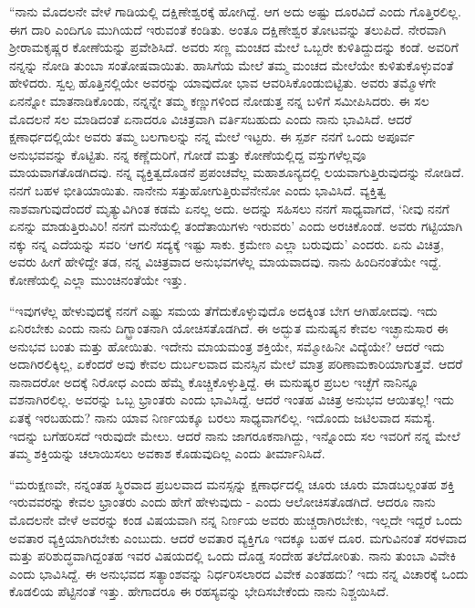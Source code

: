 “ನಾನು ಮೊದಲನೇ ವೇಳೆ ಗಾಡಿಯಲ್ಲಿ ದಕ್ಷಿಣೇಶ್ವರಕ್ಕೆ ಹೋಗಿದ್ದೆ. ಆಗ ಅದು ಅಷ್ಟು ದೂರವಿದೆ ಎಂದು ಗೊತ್ತಿರಲಿಲ್ಲ. ಈಗ ದಾರಿ ಎಂದಿಗೂ ಮುಗಿಯದೆ ಇರುವಂತೆ ಕಂಡಿತು. ಅಂತೂ ದಕ್ಷಿಣೇಶ್ವರ ತೋಟವನ್ನು ತಲುಪಿದೆ. ನೇರವಾಗಿ ಶ‍್ರೀರಾಮಕೃಷ್ಣರ ಕೋಣೆಯನ್ನು ಪ್ರವೇಶಿಸಿದೆ. ಅವರು ಸಣ್ಣ ಮಂಚದ ಮೇಲೆ ಒಬ್ಬರೇ ಕುಳಿತಿದ್ದುದನ್ನು ಕಂಡೆ. ಅವರಿಗೆ ನನ್ನನ್ನು ನೋಡಿ ತುಂಬಾ ಸಂತೋಷವಾಯಿತು. ಹಾಸಿಗೆಯ ಮೇಲೆ ತಮ್ಮ ಮಂಚದ ಮೇಲೆಯೇ ಕುಳಿತುಕೊಳ್ಳುವಂತೆ ಹೇಳಿದರು. ಸ್ವಲ್ಪ ಹೊತ್ತಿನಲ್ಲಿಯೇ ಅವರನ್ನು ಯಾವುದೋ ಭಾವ ಆವರಿಸಿಕೊಂಡುಬಿಟ್ಟಿತು. ಅವರು ತಮ್ಮೊಳಗೇ ಏನನ್ನೋ ಮಾತನಾಡಿಕೊಂಡು, ನನ್ನನ್ನೇ ತಮ್ಮ ಕಣ್ಣುಗಳಿಂದ ನೋಡುತ್ತ ನನ್ನ ಬಳಿಗೆ ಸಮೀಪಿಸಿದರು. ಈ ಸಲ ಮೊದಲನೆ ಸಲ ಮಾಡಿದಂತೆ ಏನಾದರೂ ವಿಚಿತ್ರವಾಗಿ ವರ್ತಿಸಬಹುದು ಎಂದು ನಾನು ಭಾವಿಸಿದೆ. ಆದರೆ ಕ್ಷಣಾರ್ಧದಲ್ಲಿಯೇ ಅವರು ತಮ್ಮ ಬಲಗಾಲನ್ನು ನನ್ನ ಮೇಲೆ ಇಟ್ಟರು. ಈ ಸ್ಪರ್ಶ ನನಗೆ ಒಂದು ಅಪೂರ್ವ ಅನುಭವವನ್ನು ಕೊಟ್ಟಿತು. ನನ್ನ ಕಣ್ಣೆದುರಿಗೆ, ಗೋಡೆ ಮತ್ತು ಕೋಣೆಯಲ್ಲಿದ್ದ ವಸ್ತುಗಳೆಲ್ಲವೂ ಮಾಯವಾಗತೊಡಗಿದವು. ನನ್ನ ವ್ಯಕ್ತಿತ್ವದೊಡನೆ ಪ್ರಪಂಚವೆಲ್ಲ ಮಹಾಶೂನ್ಯದಲ್ಲಿ ಲಯವಾಗುತ್ತಿರುವುದನ್ನು ನೋಡಿದೆ. ನನಗೆ ಬಹಳ ಭೀತಿಯಾಯಿತು. ನಾನೇನು ಸತ್ತುಹೋಗುತ್ತಿರುವೆನೇನೋ ಎಂದು ಭಾವಿಸಿದೆ. ವ್ಯಕ್ತಿತ್ವ ನಾಶವಾಗುವುದೆಂದರೆ ಮೃತ್ಯುವಿಗಿಂತ ಕಡಮೆ ಏನಲ್ಲ ಅದು. ಅದನ್ನು ಸಹಿಸಲು ನನಗೆ ಸಾಧ್ಯವಾಗದೆ, ‘ನೀವು ನನಗೆ ಏನನ್ನು ಮಾಡುತ್ತಿರುವಿರಿ! ನನಗೆ ಮನೆಯಲ್ಲಿ ತಂದೆತಾಯಿಗಳು ಇರುವರು’ ಎಂದು ಅರಚಿಕೊಂಡೆ. ಅವರು ಗಟ್ಟಿಯಾಗಿ ನಕ್ಕು ನನ್ನ ಎದೆಯನ್ನು ಸವರಿ ‘ಆಗಲಿ ಸದ್ಯಕ್ಕೆ ಇಷ್ಟು ಸಾಕು. ಕ್ರಮೇಣ ಎಲ್ಲಾ ಬರುವುದು’ ಎಂದರು. ಏನು ವಿಚಿತ್ರ, ಅವರು ಹೀಗೆ ಹೇಳಿದ್ದೇ ತಡ, ನನ್ನ ವಿಚಿತ್ರವಾದ ಅನುಭವಗಳೆಲ್ಲ ಮಾಯವಾದವು. ನಾನು ಹಿಂದಿನಂತೆಯೇ ಇದ್ದೆ. ಕೋಣೆಯಲ್ಲಿ ಎಲ್ಲಾ ಮುಂಚಿನಂತೆಯೇ ಇತ್ತು.

“ಇವುಗಳೆಲ್ಲ ಹೇಳುವುದಕ್ಕೆ ನನಗೆ ಎಷ್ಟು ಸಮಯ ತೆಗೆದುಕೊಳ್ಳುವುದೊ ಅದಕ್ಕಿಂತ ಬೇಗ ಆಗಿಹೋದವು. ಇದು ಏನಿರಬೇಕು ಎಂದು ನಾನು ದಿಗ್ಭ್ರಾಂತನಾಗಿ ಯೋಚಿಸತೊಡಗಿದೆ. ಈ ಅದ್ಭುತ ಮನುಷ್ಯನ ಕೇವಲ ಇಚ್ಛಾನುಸಾರ ಈ ಅನುಭವ ಬಂತು ಮತ್ತು ಹೋಯಿತು. ಇದೇನು ಮಾಯಮಂತ್ರ ಶಕ್ತಿಯೇ, ಸಮ್ಮೋಹಿನೀ ವಿದ್ಯೆಯೇ? ಆದರೆ ಇದು ಅದಾಗಿರಲಿಕ್ಕಿಲ್ಲ, ಏಕೆಂದರೆ ಅವು ಕೇವಲ ದುರ್ಬಲವಾದ ಮನಸ್ಸಿನ ಮೇಲೆ ಮಾತ್ರ ಪರಿಣಾಮಕಾರಿಯಾಗುತ್ತವೆ. ಆದರೆ ನಾನಾದರೋ ಅದಕ್ಕೆ ನಿರೋಧ ಎಂದು ಹೆಮ್ಮೆ ಕೊಚ್ಚಿಕೊಳ್ಳುತ್ತಿದ್ದೆ. ಈ ಮನುಷ್ಯರ ಪ್ರಬಲ ಇಚ್ಛೆಗೆ ನಾನಿನ್ನೂ ವಶನಾಗಿರಲಿಲ್ಲ. ಅವರನ್ನು ಒಬ್ಬ ಭ್ರಾಂತರು ಎಂದು ಭಾವಿಸಿದ್ದೆ. ಆದರೆ ಇಂತಹ ವಿಚಿತ್ರ ಅನುಭವ ಆಯಿತಲ್ಲ! ಇದು ಏತಕ್ಕೆ ಇರಬಹುದು? ನಾನು ಯಾವ ನಿರ್ಣಯಕ್ಕೂ ಬರಲು ಸಾಧ್ಯವಾಗಲಿಲ್ಲ. ಇದೊಂದು ಜಟಿಲವಾದ ಸಮಸ್ಯೆ. ಇದನ್ನು ಬಗೆಹರಿಸದೆ ಇರುವುದೇ ಮೇಲು. ಆದರೆ ನಾನು ಜಾಗರೂಕನಾಗಿದ್ದು, ಇನ್ನೊಂದು ಸಲ ಇವರಿಗೆ ನನ್ನ ಮೇಲೆ ತಮ್ಮ ಶಕ್ತಿಯನ್ನು ಚಲಾಯಿಸಲು ಅವಕಾಶ ಕೊಡುವುದಿಲ್ಲ ಎಂದು ತೀರ್ಮಾನಿಸಿದೆ.

\vskip 2pt

“ಮರುಕ್ಷಣವೇ, ನನ್ನಂತಹ ಸ್ಥಿರವಾದ ಪ್ರಬಲವಾದ ಮನಸ್ಸನ್ನು ಕ್ಷಣಾರ್ಧದಲ್ಲಿ ಚೂರು ಚೂರು ಮಾಡಬಲ್ಲಂತಹ ಶಕ್ತಿ ಇರುವವರನ್ನು ಕೇವಲ ಭ್ರಾಂತರು ಎಂದು ಹೇಗೆ ಹೇಳುವುದು - ಎಂದು ಆಲೋಚಿಸತೊಡಗಿದೆ. ಆದರೂ ನಾನು ಮೊದಲನೇ ವೇಳೆ ಅವರನ್ನು ಕಂಡ ವಿಷಯವಾಗಿ ನನ್ನ ನಿರ್ಣಯ ಅವರು ಹುಚ್ಚರಾಗಿರಬೇಕು, ಇಲ್ಲದೇ ಇದ್ದರೆ ಒಂದು ಅವತಾರ ವ್ಯಕ್ತಿಯಾಗಿರಬೇಕು ಎಂಬುದು. ಆದರೆ ಅವತಾರ ವ್ಯಕ್ತಿಗೂ ಇದಕ್ಕೂ ಬಹಳ ದೂರ. ಮಗುವಿನಂತೆ ಸರಳವಾದ ಮತ್ತು ಪರಿಶುದ್ಧವಾಗಿದ್ದಂತಹ ಇವರ ವಿಷಯದಲ್ಲಿ ಒಂದು ದೊಡ್ಡ ಸಂದೇಹ ತಲೆದೋರಿತು. ನಾನು ತುಂಬಾ ವಿವೇಕಿ ಎಂದು ಭಾವಿಸಿದ್ದೆ. ಈ ಅನುಭವದ ಸತ್ಯಾಂಶವನ್ನು ನಿರ್ಧರಿಸಲಾರದ ವಿವೇಕ ಎಂತಹದು? ಇದು ನನ್ನ ವಿಚಾರಕ್ಕೆ ಒಂದು ಕೊಡಲಿಯ ಪೆಟ್ಟಿನಂತೆ ಇತ್ತು. ಹೇಗಾದರೂ ಈ ರಹಸ್ಯವನ್ನು ಭೇದಿಸಬೇಕೆಂದು ನಾನು ನಿಶ್ಚಯಿಸಿದೆ.

